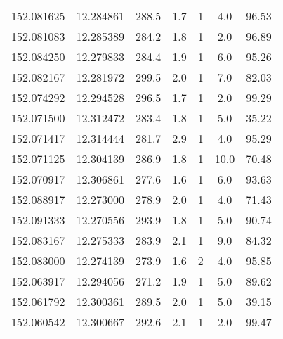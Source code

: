\documentclass[%
 aip,
 jmp,%
 amsmath,amssymb,
 reprint,%
]{aastex61}
\begin{document}
\begin{center}
\begin{longtable}{lcccccc}
152.081625 & 12.284861 & 288.5 & 1.7 & 1 & 4.0 & 96.53 \\
152.081083 & 12.285389 & 284.2 & 1.8 & 1 & 2.0 & 96.89 \\
152.084250 & 12.279833 & 284.4 & 1.9 & 1 & 6.0 & 95.26 \\
152.082167 & 12.281972 & 299.5 & 2.0 & 1 & 7.0 & 82.03 \\
152.074292 & 12.294528 & 296.5 & 1.7 & 1 & 2.0 & 99.29 \\
152.071500 & 12.312472 & 283.4 & 1.8 & 1 & 5.0 & 35.22 \\
152.071417 & 12.314444 & 281.7 & 2.9 & 1 & 4.0 & 95.29 \\
152.071125 & 12.304139 & 286.9 & 1.8 & 1 & 10.0 & 70.48 \\
152.070917 & 12.306861 & 277.6 & 1.6 & 1 & 6.0 & 93.63 \\
152.088917 & 12.273000 & 278.9 & 2.0 & 1 & 4.0 & 71.43 \\
152.091333 & 12.270556 & 293.9 & 1.8 & 1 & 5.0 & 90.74 \\
152.083167 & 12.275333 & 283.9 & 2.1 & 1 & 9.0 & 84.32 \\
152.083000 & 12.274139 & 273.9 & 1.6 & 2 & 4.0 & 95.85 \\
152.063917 & 12.294056 & 271.2 & 1.9 & 1 & 5.0 & 89.62 \\
152.061792 & 12.300361 & 289.5 & 2.0 & 1 & 5.0 & 39.15 \\
152.060542 & 12.300667 & 292.6 & 2.1 & 1 & 2.0 & 99.47 \\
\end{longtable}
\end{center}
\end{document}
